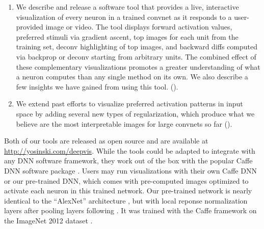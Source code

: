 \documentclass{article}
\begin{document}
\begin{enumerate}

\item We describe and release a software tool that provides a live, interactive visualization of every neuron in a trained convnet as it responds to a user-provided image or video. The tool displays forward activation values, preferred stimuli via gradient ascent, top images for each unit from the training set, deconv highlighting \cite{zeiler2013visualizing-and-understanding-convolutional} of top images, and backward diffs computed via backprop or deconv starting from arbitrary units. The combined effect of these complementary visualizations promotes a greater understanding of what a neuron computes than any single method on its own. We also describe a few insights we have gained from using this tool.
().


\item We extend past efforts to visualize preferred activation patterns in input space by adding several new types of regularization, which produce what we believe are the most interpretable images for large convnets so far ().

\end{enumerate}

Both of our tools are released as open source and are available at
\url{http://yosinski.com/deepvis}. While the tools could be adapted to integrate with any DNN software framework, they work out of the box with 
the popular Caffe DNN software package \cite{jia2014caffe:-convolutional-architecture}.
Users may run visualizations with their own Caffe DNN or our pre-trained DNN, which comes with pre-computed images optimized to activate each neuron in this trained network. Our pre-trained network is nearly identical to the ``AlexNet'' architecture \cite{krizhevsky2012imagenet-classification-with-deep}, but with local reponse normalization layers after pooling layers following \citep{jia2014caffe:-convolutional-architecture}. It was trained with the Caffe framework on the ImageNet 2012 dataset \cite{deng2009imagenet:-a-large-scale-hierarchical}. 
\end{document}
